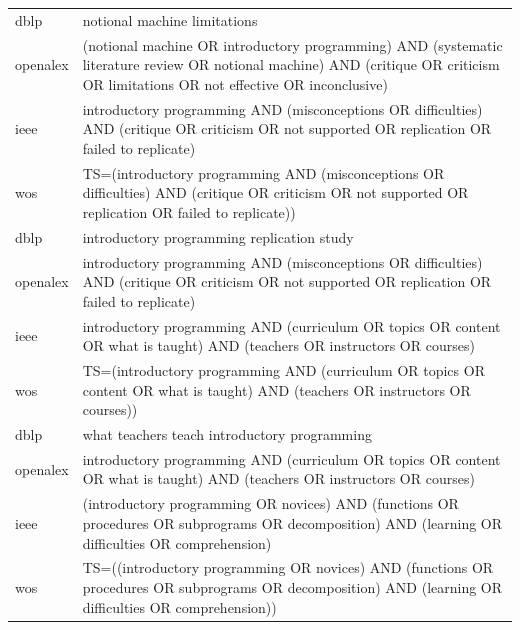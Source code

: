 \documentclass{article}
\begin{document}
\begin{longtable}{lp{10cm}}
dblp & notional machine limitations \\
openalex & (\textquotedbl{}notional machine\textquotedbl{} OR \textquotedbl{}introductory programming\textquotedbl{}) AND (\textquotedbl{}systematic literature review\textquotedbl{} OR \textquotedbl{}notional machine\textquotedbl{}) AND (critique OR criticism OR limitations OR \textquotedbl{}not effective\textquotedbl{} OR inconclusive) \\
ieee & \textquotedbl{}introductory programming\textquotedbl{} AND (misconceptions OR difficulties) AND (critique OR criticism OR \textquotedbl{}not supported\textquotedbl{} OR replication OR \textquotedbl{}failed to replicate\textquotedbl{}) \\
wos & TS=(\textquotedbl{}introductory programming\textquotedbl{} AND (misconceptions OR difficulties) AND (critique OR criticism OR \textquotedbl{}not supported\textquotedbl{} OR replication OR \textquotedbl{}failed to replicate\textquotedbl{})) \\
dblp & introductory programming replication study \\
openalex & \textquotedbl{}introductory programming\textquotedbl{} AND (misconceptions OR difficulties) AND (critique OR criticism OR \textquotedbl{}not supported\textquotedbl{} OR replication OR \textquotedbl{}failed to replicate\textquotedbl{}) \\
ieee & \textquotedbl{}introductory programming\textquotedbl{} AND (curriculum OR topics OR content OR \textquotedbl{}what is taught\textquotedbl{}) AND (teachers OR instructors OR courses) \\
wos & TS=(\textquotedbl{}introductory programming\textquotedbl{} AND (curriculum OR topics OR content OR \textquotedbl{}what is taught\textquotedbl{}) AND (teachers OR instructors OR courses)) \\
dblp & what teachers teach introductory programming \\
openalex & \textquotedbl{}introductory programming\textquotedbl{} AND (curriculum OR topics OR content OR \textquotedbl{}what is taught\textquotedbl{}) AND (teachers OR instructors OR courses) \\
ieee & (\textquotedbl{}introductory programming\textquotedbl{} OR novices) AND (functions OR procedures OR subprograms OR decomposition) AND (learning OR difficulties OR comprehension) \\
wos & TS=((\textquotedbl{}introductory programming\textquotedbl{} OR novices) AND (functions OR procedures OR subprograms OR decomposition) AND (learning OR difficulties OR comprehension)) \\

\end{longtable}
\end{document}
